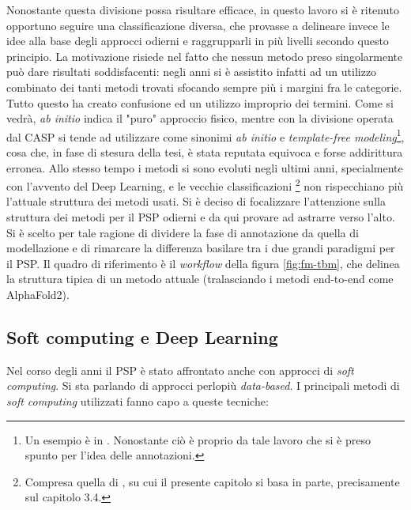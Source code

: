 {\par Nonostante questa divisione possa risultare efficace, in questo lavoro si è ritenuto opportuno seguire una classificazione diversa, che provasse a delineare invece le idee alla base degli approcci odierni e raggrupparli in più livelli secondo questo principio. La motivazione risiede nel fatto che nessun metodo preso singolarmente può dare risultati soddisfacenti: negli anni si è assistito infatti ad un utilizzo combinato dei tanti metodi trovati sfocando sempre più i margini fra le categorie. Tutto questo ha creato confusione ed un utilizzo improprio dei termini. Come si vedrà, \textit{ab initio} indica il "puro" approccio fisico, mentre con la divisione operata dal CASP si tende ad utilizzare come sinonimi \textit{ab initio} e \textit{template-free modeling}\footnote{Un esempio è in . Nonostante ciò è proprio da tale lavoro che si è preso spunto per l'idea delle annotazioni.}, cosa che, in fase di stesura della tesi, è stata reputata equivoca e forse addirittura erronea. Allo stesso tempo i metodi si sono evoluti negli ultimi anni, specialmente con l'avvento del Deep Learning, e le vecchie classificazioni \footnote{Compresa quella di , su cui il presente capitolo si basa in parte, precisamente sul capitolo 3.4.} non rispecchiano più l'attuale struttura dei metodi usati. Si è deciso di focalizzare l'attenzione sulla struttura dei metodi per il PSP odierni e da qui provare ad astrarre verso l'alto. Si è scelto per tale ragione di dividere la fase di annotazione da quella di modellazione e di rimarcare la differenza basilare tra i due grandi paradigmi per il PSP. Il quadro di riferimento è il \textit{workflow} della figura \ref{fig:fm-tbm}, che delinea la struttura tipica di un metodo attuale (tralasciando i metodi end-to-end come AlphaFold2). 

}

\subsection{Soft computing e Deep Learning}

Nel corso degli anni il PSP è stato affrontato anche con approcci di \textit{soft computing}. Si sta parlando di approcci perlopiù \textit{data-based}. I principali metodi di \textit{soft computing }utilizzati fanno capo a queste tecniche\supercite{marquez2015soft}:


